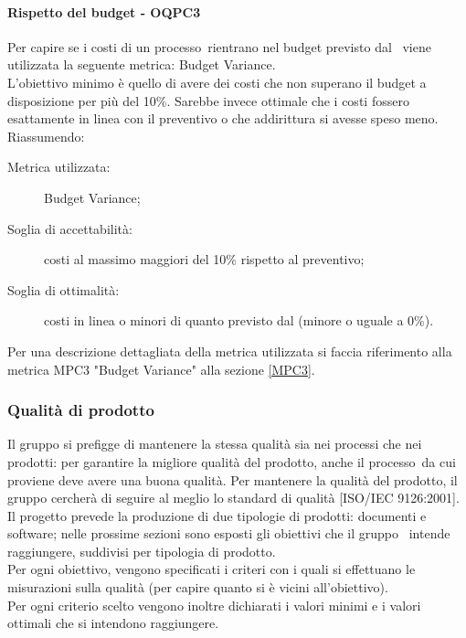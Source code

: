 \documentclass[../PianoDiQualifica.tex]{subfiles}
\begin{document}
		\paragraph{Rispetto del budget - OQPC3}
		Per capire se i costi di un processo\g\ rientrano nel budget previsto dal \pianodiprogetto\ viene utilizzata la seguente metrica: Budget Variance.\\
		L’obiettivo minimo è quello di avere dei costi che non superano il budget a disposizione per più del 10\%. Sarebbe invece ottimale che i costi fossero esattamente in linea con il preventivo o che addirittura si avesse speso meno.\\
		Riassumendo:
		\begin{description}
			\item[Metrica utilizzata:] Budget Variance;
			\item[Soglia di accettabilità:] costi al massimo maggiori del 10\% rispetto al preventivo;
			\item[Soglia di ottimalità:] costi in linea o minori di quanto previsto dal \pianodiprogetto (minore o uguale a 0\%).
		\end{description}
		Per una descrizione dettagliata della metrica utilizzata si faccia riferimento alla metrica MPC3 "Budget Variance" alla sezione \ref{MPC3}.
		
		\subsubsection{Qualità di prodotto}
		Il gruppo si prefigge di mantenere la stessa qualità sia nei processi che nei prodotti: per garantire la migliore qualità del prodotto\g, anche il processo\g\ da cui proviene deve avere una buona qualità. Per mantenere la qualità del prodotto\g, il gruppo cercherà di seguire al meglio lo standard di qualità [ISO/IEC 9126:2001].\\
		Il progetto prevede la produzione di due tipologie di prodotti: documenti e software\g; nelle prossime sezioni sono esposti gli obiettivi che il gruppo \leaf\ intende raggiungere, suddivisi per tipologia di prodotto\g.\\
		Per ogni obiettivo, vengono specificati i criteri con i quali si effettuano le misurazioni sulla qualità (per capire quanto si è vicini all’obiettivo).\\
		Per ogni criterio scelto vengono inoltre dichiarati i valori minimi e i valori ottimali che si intendono raggiungere.
				
\end{document}
